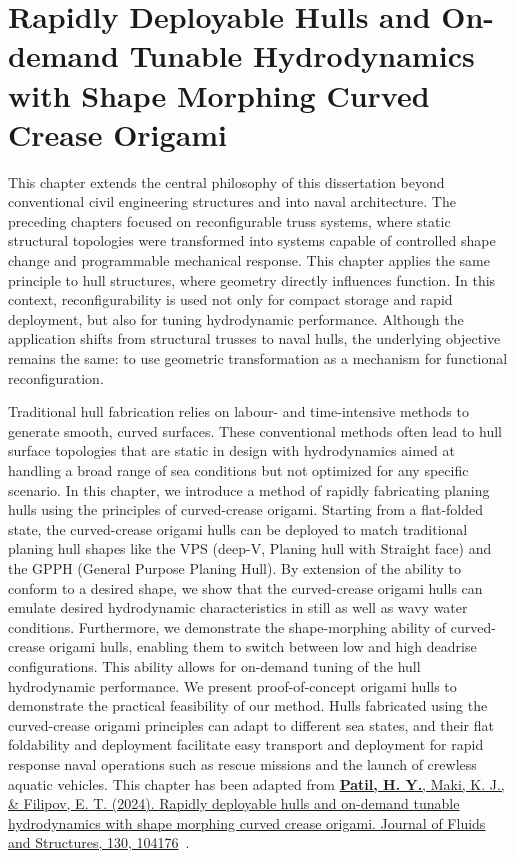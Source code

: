 \chapter{Rapidly Deployable Hulls and On-demand Tunable Hydrodynamics with Shape Morphing Curved Crease Origami}\label{chapter-05}
This chapter extends the central philosophy of this dissertation beyond conventional civil engineering structures and into naval architecture. The preceding chapters focused on reconfigurable truss systems, where static structural topologies were transformed into systems capable of controlled shape change and programmable mechanical response. This chapter applies the same principle to hull structures, where geometry directly influences function. In this context, reconfigurability is used not only for compact storage and rapid deployment, but also for tuning hydrodynamic performance. Although the application shifts from structural trusses to naval hulls, the underlying objective remains the same: to use geometric transformation as a mechanism for functional reconfiguration.

Traditional hull fabrication relies on labour- and time-intensive methods to generate smooth, curved surfaces. These conventional methods often lead to hull surface topologies that are static in design with hydrodynamics aimed at handling a broad range of sea conditions but not optimized for any specific scenario. In this chapter, we introduce a method of rapidly fabricating planing hulls using the principles of curved-crease origami. Starting from a flat-folded state, the curved-crease origami hulls can be deployed to match traditional planing hull shapes like the VPS (deep-V, Planing hull with Straight face) and the GPPH (General Purpose Planing Hull). By extension of the ability to conform to a desired shape, we show that the curved-crease origami hulls can emulate desired hydrodynamic characteristics in still as well as wavy water conditions. Furthermore, we demonstrate the shape-morphing ability of curved-crease origami hulls, enabling them to switch between low and high deadrise configurations. This ability allows for on-demand tuning of the hull hydrodynamic performance. We present proof-of-concept origami hulls to demonstrate the practical feasibility of our method. Hulls fabricated using the curved-crease origami principles can adapt to different sea states, and their flat foldability and deployment facilitate easy transport and deployment for rapid response naval operations such as rescue missions and the launch of crewless aquatic vehicles. This chapter has been adapted from \href{https://doi.org/10.1016/j.jfluidstructs.2024.104176}{\textbf{Patil, H. Y.}, Maki, K. J., \& Filipov, E. T. (2024). Rapidly deployable hulls and on-demand tunable hydrodynamics with shape morphing curved crease origami. Journal of Fluids and Structures, 130, 104176}~\cite{patil2024ccohulls}.


